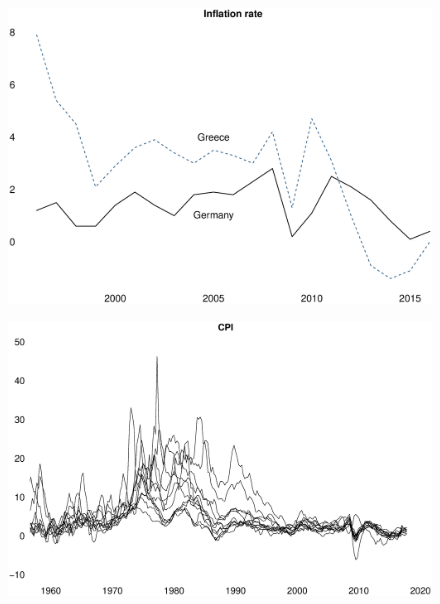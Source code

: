 \documentclass{beamer}
\begin{document}
\begin{frame}
  \begin{figure}
    \includegraphics[scale=.3]{inflation.eps}
  \end{figure}
\end{frame}

\begin{frame}
  \begin{figure}
    \includegraphics[scale=.29]{cpi.eps}
  \end{figure}
\end{frame}
\end{document}
